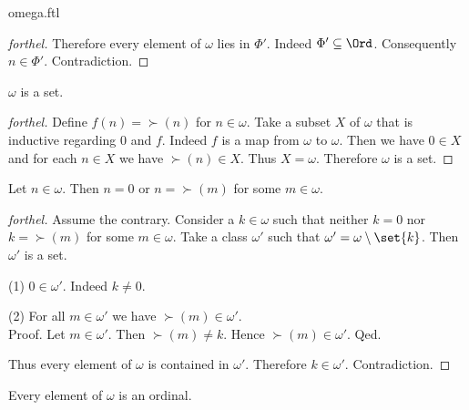 \documentclass{naproche-library}
\begin{document}
\begin{smodule}{omega.ftl}
\begin{proof}[forthel]
    Therefore every element of $\omega$ lies in $\Phi'$.
    Indeed $\Phi' \subseteq \Ord$.
    Consequently $n \in \Phi'$.
    Contradiction.
  \end{proof}

  \begin{corollary}[forthel,id=SET_THEORY_03_4847727433220096,printid]
    $\omega$ is a set.
  \end{corollary}
  \begin{proof}[forthel]
    Define $f(n) = \succ(n)$ for $n \in \omega$.
    Take a subset $X$ of $\omega$ that is inductive regarding $0$ and $f$.
    Indeed $f$ is a map from $\omega$ to $\omega$.
    Then we have $0 \in X$ and for each $n \in X$ we have $\succ(n) \in X$.
    Thus $X = \omega$.
    Therefore $\omega$ is a set.
  \end{proof}

  \begin{proposition}[forthel,id=SET_THEORY_03_5885789275684864,printid]
    Let $n \in \omega$.
    Then $n = 0$ or $n = \succ(m)$ for some $m \in \omega$.
  \end{proposition}
  \begin{proof}[forthel]
    Assume the contrary.
    Consider a $k \in \omega$ such that neither $k = 0$ nor $k = \succ(m)$ for
    some $m \in \omega$.
    Take a class $\omega'$ such that $\omega' = \omega \setminus \set{k}$. %
    Then $\omega'$ is a set.

    (1) $0 \in \omega'$.
    Indeed $k \neq 0$.

    (2) For all $m \in \omega'$ we have $\succ(m) \in \omega'$. \\
    Proof.
      Let $m \in \omega'$.
      Then $\succ(m) \neq k$.
      Hence $\succ(m) \in \omega'$.
    Qed.

    Thus every element of $\omega$ is contained in $\omega'$.
    Therefore $k \in \omega'$.
    Contradiction.
  \end{proof}

  \begin{proposition}[forthel,id=SET_THEORY_03_5057540872208384,printid]
    Every element of $\omega$ is an ordinal.
  \end{proposition}
\end{smodule}
\end{document}

